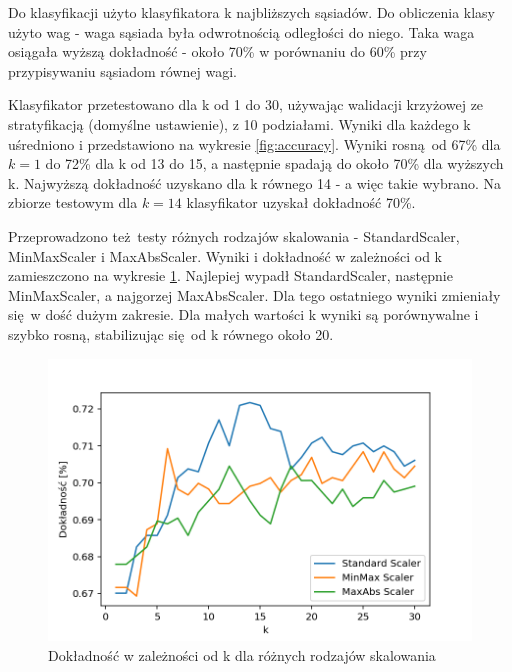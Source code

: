 \documentclass[12pt]{article}
\begin{document}
Do klasyfikacji użyto klasyfikatora k najbliższych sąsiadów. Do obliczenia klasy użyto wag - waga sąsiada była odwrotnością odległości do niego. Taka waga osiągała wyższą dokładność - około 70\% w porównaniu do 60\% przy przypisywaniu sąsiadom równej wagi.

Klasyfikator przetestowano dla k od 1 do 30, używając walidacji krzyżowej ze stratyfikacją (domyślne ustawienie), z 10 podziałami. Wyniki dla każdego k uśredniono i przedstawiono na wykresie \ref{fig:accuracy}. Wyniki rosną od 67\% dla $k=1$ do 72\% dla k od 13 do 15, a następnie spadają do około 70\% dla wyższych k. Najwyższą dokładność uzyskano dla k równego 14 - a więc takie wybrano. Na zbiorze testowym dla $k=14$ klasyfikator uzyskał dokładność 70\%.

Przeprowadzono też testy różnych rodzajów skalowania - StandardScaler, MinMaxScaler i MaxAbsScaler. Wyniki i dokładność w zależności od k zamieszczono na wykresie \ref{fig:accuracy-scalers}. Najlepiej wypadł StandardScaler, następnie MinMaxScaler, a najgorzej MaxAbsScaler. Dla tego ostatniego wyniki zmieniały się w dość dużym zakresie. Dla małych wartości k wyniki są porównywalne i szybko rosną, stabilizując się od k równego około 20.

\begin{figure}[htb!]
	\centering
	\includegraphics[width=0.7\columnwidth]{accuracy_scalers.png}
	\caption{Dokładność w zależności od k dla różnych rodzajów skalowania}
	\label{fig:accuracy-scalers}
\end{figure}
\end{document}
